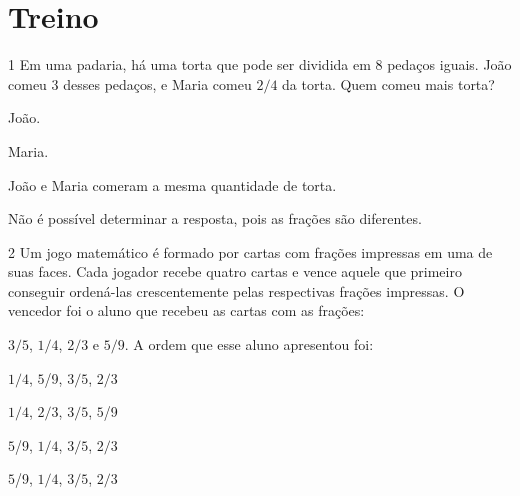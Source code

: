 \section{Treino}

\num{1}  Em uma padaria, há uma torta que pode ser dividida em $8$ pedaços
iguais. João comeu $3$ desses pedaços, e Maria comeu $2/4$ da torta. Quem
comeu mais torta?

\begin{escolha}
\item João.
\item Maria.
\item João e Maria comeram a mesma quantidade de torta.
\item Não é possível determinar a resposta, pois as frações são diferentes.
\end{escolha}




\num{2}  Um jogo matemático é formado por cartas com frações impressas em uma
de suas faces. Cada jogador recebe quatro cartas e vence aquele que
primeiro conseguir ordená-las crescentemente pelas respectivas frações
impressas. O vencedor foi o aluno que recebeu as cartas com as frações:

$3/5$, $1/4$, $2/3$ e $5/9$. A ordem que esse aluno apresentou foi:

\begin{escolha}
\item $1/4$, $5$/9, $3/5$, $2/3$
\item $1/4$, $2/3$, $3/5$, $5$/9
\item $5$/9, $1/4$, $3/5$, $2/3$
\item $5$/9, $1/4$, $3/5$, $2/3$
\end{escolha}

